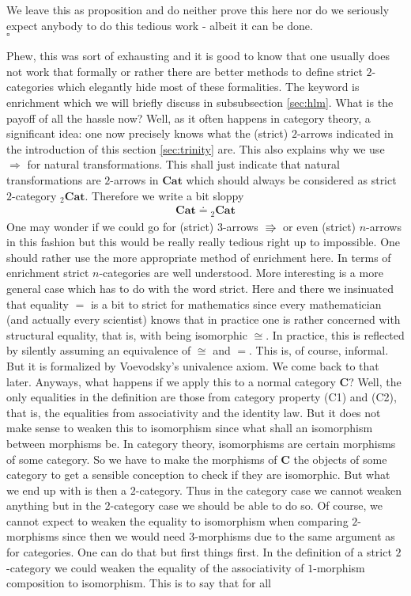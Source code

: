 \begin{prf}
We leave this as proposition and do neither prove this here nor do we seriously expect anybody to do this tedious work - albeit it can be done.
\\
\phantom{proven}
\hfill
$\square$
\end{prf}
Phew, this was sort of exhausting and it is good to know that one usually does not work that formally or rather there are better methods to define strict $2$-categories which elegantly hide most of these formalities. The keyword is {\glqq}enrichment{\grqq} which we will briefly discuss in subsubsection \ref{sec:hlm}. What is the payoff of all the hassle now? Well, as it often happens in category theory, a significant idea: one now precisely knows what the (strict) $2$-arrows indicated in the introduction of this section \ref{sec:trinity} are. This also explains why we use $\Rightarrow$ for natural transformations. This shall just indicate that natural transformations are $2$-arrows in $\mathbf{Cat}$ which should always be considered as strict $2$-category ${}_{2}\mathbf{Cat}$. Therefore we write a bit sloppy
\begin{align*}
  \mathbf{Cat}
  \doteq
  {}_{2}\mathbf{Cat}
\end{align*}
One may wonder if we could go for (strict) $3$-arrows $\Rrightarrow$ or even (strict) $n$-arrows in this fashion but this would be really really tedious right up to impossible. One should rather use the more appropriate method of enrichment here. In terms of enrichment strict $n$-categories are well understood. More interesting is a more general case which has to do with the word {\glqq}strict{\grqq}. Here and there we insinuated that equality $=$ is a bit to strict for mathematics since every mathematician (and actually every scientist) knows that in practice one is rather concerned with structural equality, that is, with being isomorphic $\cong$. In practice, this is reflected by silently assuming an equivalence of $\cong$ and $=$. This is, of course, informal. But it is formalized by Voevodsky's {\glqq}univalence axiom{\grqq}. We come back to that later. Anyways, what happens if we apply this to a normal category $\mathbf{C}$? Well, the only equalities in the definition are those from category property (C1) and (C2), that is, the equalities from associativity and the identity law. But it does not make sense to weaken this to isomorphism since what shall an isomorphism between morphisms be. In category theory, isomorphisms are certain morphisms of some category. So we have to make the morphisms of $\mathbf{C}$ the objects of some category to get a sensible conception to check if they are isomorphic. But what we end up with is then a $2$-category. Thus in the category case we cannot weaken anything but in the $2$-category case we should be able to do so. Of course, we cannot expect to weaken the equality to isomorphism when comparing $2$-morphisms since then we would need $3$-morphisms due to the same argument as for categories. One can do that but first things first. In the definition of a strict $2$-category we could weaken the equality of the associativity of $1$-morphism composition to isomorphism. This is to say that for all
